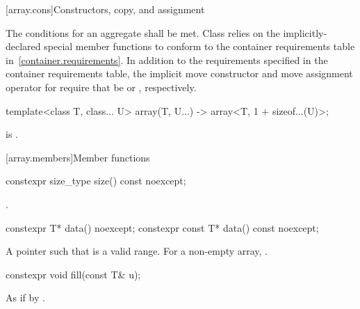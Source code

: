 [array.cons]{Constructors, copy, and assignment}

\pnum
{}%
%
The conditions for an aggregate shall be
met. Class  relies on the implicitly-declared special
member functions to
conform to the container requirements table in~\ref{container.requirements}.
In addition to the requirements specified in the container requirements table,
the implicit move constructor and move assignment operator for 
require that  be  or ,
respectively.

\begin{itemdecl}
template<class T, class... U>
  array(T, U...) -> array<T, 1 + sizeof...(U)>;
\end{itemdecl}
\begin{itemdescr}
\pnum
\mandates
{} is .
\end{itemdescr}

[array.members]{Member functions}

%
\begin{itemdecl}
constexpr size_type size() const noexcept;
\end{itemdecl}

\begin{itemdescr}
\pnum
\returns
{}.
\end{itemdescr}

%
\begin{itemdecl}
constexpr T* data() noexcept;
constexpr const T* data() const noexcept;
\end{itemdecl}

\begin{itemdescr}
\pnum
\returns
A pointer such that  is a valid range. For a
non-empty array,  \tcode{==} .
\end{itemdescr}

%
\begin{itemdecl}
constexpr void fill(const T& u);
\end{itemdecl}

\begin{itemdescr}
\pnum
\effects
As if by .
\end{itemdescr}

